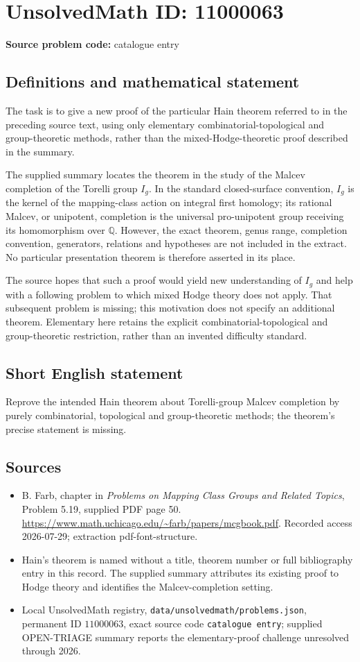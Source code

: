 \documentclass[11pt]{article}
\newcommand{\Q}{\mathbb{Q}}
\begin{document}
\section*{UnsolvedMath ID: 11000063}
\textbf{Source problem code:} catalogue entry
\subsection{Definitions and mathematical statement}
The task is to give a new proof of the particular Hain theorem referred to in the preceding source text, using only elementary combinatorial-topological and group-theoretic methods, rather than the mixed-Hodge-theoretic proof described in the summary.

The supplied summary locates the theorem in the study of the Malcev completion of the Torelli group \(I_g\). In the standard closed-surface convention, \(I_g\) is the kernel of the mapping-class action on integral first homology; its rational Malcev, or unipotent, completion is the universal pro-unipotent group receiving its homomorphism over \(\Q\). However, the exact theorem, genus range, completion convention, generators, relations and hypotheses are not included in the extract. No particular presentation theorem is therefore asserted in its place.

The source hopes that such a proof would yield new understanding of \(I_g\) and help with a following problem to which mixed Hodge theory does not apply. That subsequent problem is missing; this motivation does not specify an additional theorem. Elementary here retains the explicit combinatorial-topological and group-theoretic restriction, rather than an invented difficulty standard.
\subsection{Short English statement}
Reprove the intended Hain theorem about Torelli-group Malcev completion by purely combinatorial, topological and group-theoretic methods; the theorem's precise statement is missing.
\subsection{Sources}
\begin{itemize}
\item B. Farb, chapter in \emph{Problems on Mapping Class Groups and Related Topics}, Problem 5.19, supplied PDF page 50. \url{https://www.math.uchicago.edu/~farb/papers/mcgbook.pdf}. Recorded access 2026-07-29; extraction pdf-font-structure.
\item Hain's theorem is named without a title, theorem number or full bibliography entry in this record. The supplied summary attributes its existing proof to Hodge theory and identifies the Malcev-completion setting.
\item Local UnsolvedMath registry, \texttt{data/unsolvedmath/problems.json}, permanent ID \(11000063\), exact source code \texttt{catalogue entry}; supplied OPEN-TRIAGE summary reports the elementary-proof challenge unresolved through 2026.
\end{itemize}
\end{document}
